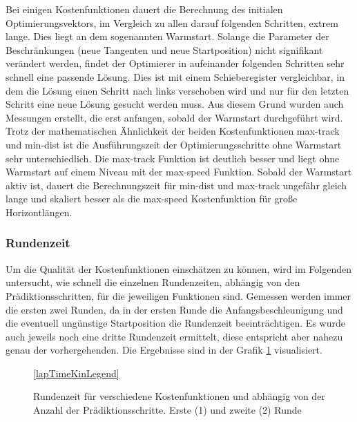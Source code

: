 \documentclass{like}
\begin{document}
Bei einigen Kostenfunktionen dauert die  Berechnung des initialen Optimierungsvektors, im Vergleich zu allen darauf folgenden Schritten, extrem lange. Dies liegt an dem sogenannten Warmstart. Solange die Parameter der Beschränkungen (neue Tangenten und neue Startposition) nicht signifikant verändert werden, findet der Optimierer in aufeinander folgenden Schritten sehr schnell eine passende Lösung. Dies ist mit einem  Schieberegister vergleichbar, in dem die Lösung einen Schritt nach links verschoben wird und nur für den letzten Schritt eine neue Lösung gesucht werden muss. Aus diesem Grund wurden auch Messungen erstellt, die erst anfangen, sobald der Warmstart durchgeführt wird. 
Trotz der mathematischen Ähnlichkeit der beiden Kostenfunktionen max-track und min-dist ist die Ausführungszeit der Optimierungsschritte ohne Warmstart sehr unterschiedlich. Die max-track Funktion ist deutlich besser und liegt ohne Warmstart auf einem Niveau mit der max-speed Funktion.
Sobald der Warmstart aktiv ist, dauert die Berechnungszeit für min-dist und max-track ungefähr gleich lange und skaliert besser als die max-speed Kostenfunktion für große Horizontlängen.




\subsubsection{Rundenzeit}
\label{laptime}
Um die Qualität der Kostenfunktionen einschätzen zu können, wird im Folgenden untersucht, wie schnell die einzelnen Rundenzeiten, abhängig von den Prädiktionsschritten, für die jeweiligen Funktionen sind.
Gemessen werden immer die ersten zwei Runden, da in der ersten Runde die Anfangsbeschleunigung und die eventuell ungünstige Startposition die Rundenzeit beeinträchtigen. Es wurde auch jeweils noch eine dritte Rundenzeit ermittelt, diese entspricht aber nahezu genau der vorhergehenden. Die Ergebnisse sind in der Grafik \ref{fig:lapTimeKin} visualisiert.

\begin{figure}[ht!]
	\centering
	 
	\ref{lapTimeKinLegend}
	\caption{Rundenzeit für verschiedene Kostenfunktionen und abhängig von der Anzahl der Prädiktionsschritte. Erste (1) und zweite (2) Runde}
	\label{fig:lapTimeKin}
\end{figure}
\end{document}
